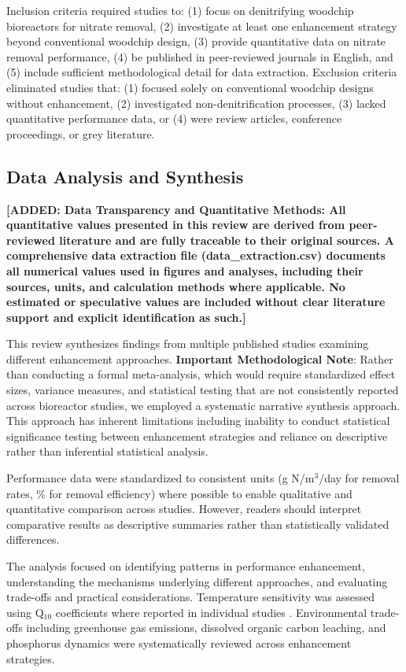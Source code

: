 \documentclass[12pt,a4paper]{article}
\newcommand{\added}[1]{\textcolor{addedtext}{\textbf{[ADDED: #1]}}}
\begin{document}
Inclusion criteria required studies to: (1) focus on denitrifying woodchip bioreactors for nitrate removal, (2) investigate at least one enhancement strategy beyond conventional woodchip design, (3) provide quantitative data on nitrate removal performance, (4) be published in peer-reviewed journals in English, and (5) include sufficient methodological detail for data extraction. Exclusion criteria eliminated studies that: (1) focused solely on conventional woodchip designs without enhancement, (2) investigated non-denitrification processes, (3) lacked quantitative performance data, or (4) were review articles, conference proceedings, or grey literature.

\subsection{Data Analysis and Synthesis}

\added{\textbf{Data Transparency and Quantitative Methods:} All quantitative values presented in this review are derived from peer-reviewed literature and are fully traceable to their original sources. A comprehensive data extraction file (data\_extraction.csv) documents all numerical values used in figures and analyses, including their sources, units, and calculation methods where applicable. No estimated or speculative values are included without clear literature support and explicit identification as such.}

This review synthesizes findings from multiple published studies examining different enhancement approaches. \textbf{Important Methodological Note}: Rather than conducting a formal meta-analysis, which would require standardized effect sizes, variance measures, and statistical testing that are not consistently reported across bioreactor studies, we employed a systematic narrative synthesis approach. This approach has inherent limitations including inability to conduct statistical significance testing between enhancement strategies and reliance on descriptive rather than inferential statistical analysis.

Performance data were standardized to consistent units (g N/m$^3$/day for removal rates, \% for removal efficiency) where possible to enable qualitative and quantitative comparison across studies. However, readers should interpret comparative results as descriptive summaries rather than statistically validated differences.

The analysis focused on identifying patterns in performance enhancement, understanding the mechanisms underlying different approaches, and evaluating trade-offs and practical considerations. Temperature sensitivity was assessed using Q$_{10}$ coefficients where reported in individual studies \citep{RN242, RN258}. Environmental trade-offs including greenhouse gas emissions, dissolved organic carbon leaching, and phosphorus dynamics were systematically reviewed across enhancement strategies.
\end{document}

